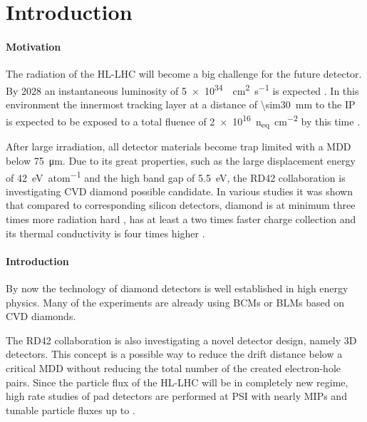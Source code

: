 \section{Introduction}
\paragraph{Motivation} 
The radiation of the \ac{HL-LHC} will become a big challenge for the future detector. By 2028 an instantaneous luminosity of \SI{5e34}{\per\centi\meter\squared\per\second} is expected \cite{hllhc}. In this environment the innermost tracking layer at a distance of \SI{\sim30}{\milli\meter} to the \ac{IP} is expected to be exposed to a total fluence of \SI{2e16}{n_{eq}\per \centi\meter^2} by this time \cite{auzinger}.\par
After large irradiation, all detector materials become trap limited with a \ac{MDD} below \SI{75}{\micro\meter}. Due to its great properties, such as the large displacement energy of \SI{42}{\electronvolt\per atom} and the high band gap of \SI{5.5}{\electronvolt}, the RD42 collaboration is investigating \ac{CVD} diamond possible candidate. In various studies it was shown that compared to corresponding silicon detectors, diamond is at minimum three times more radiation hard \cite{deboer}, has at least a two times faster charge collection \cite{pernegger} and its thermal conductivity is four times higher \cite{zhao}.\par
\paragraph{Introduction}
By now the technology of diamond detectors is well established in high energy physics. Many of the experiments are already using \acp{BCM} or \acp{BLM} based on \ac{CVD} diamonds.\par
The RD42 collaboration is also investigating a novel detector design, namely 3D detectors. This concept is a possible way to reduce the drift distance below a critical \ac{MDD} without reducing the total number of the created electron-hole pairs. Since the particle flux of the \ac{HL-LHC} will be in completely new regime, high rate studies of pad detectors are performed at \ac{PSI} with nearly \acp{MIP} and tunable particle fluxes up to .

